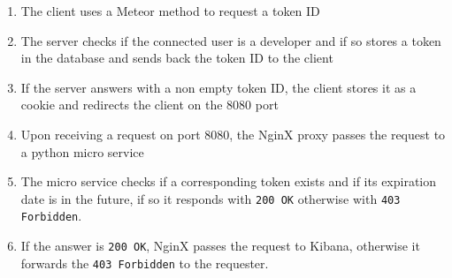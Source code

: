 \begin{enumerate}
	\item The client uses a Meteor method to request a token ID
	\item The server checks if the connected user is a developer and if so stores a token in the database and sends back the token ID to the client
	\item If the server answers with a non empty token ID, the client stores it as a cookie and redirects the client on the 8080 port
	\item Upon receiving a request on port 8080, the NginX proxy passes the request to a python micro service
	\item The micro service checks if a corresponding token exists and if its expiration date is in the future, if so it responds with \texttt{200 OK} otherwise with \texttt{403 Forbidden}.
	\item If the answer is \texttt{200 OK}, NginX passes the request to Kibana, otherwise it forwards the \texttt{403 Forbidden} to the requester.
\end{enumerate}